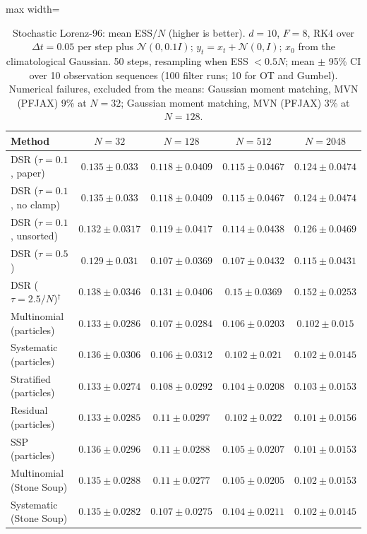 \begin{table}[H]
\centering
\small
\caption{Stochastic Lorenz-96: mean ESS$/N$ (higher is better). $d{=}10$, $F{=}8$, RK4 over $\Delta t{=}0.05$ per step plus $\mathcal N(0,0.1I)$; $y_t=x_t+\mathcal N(0,I)$; $x_0$ from the climatological Gaussian. 50 steps, resampling when ESS $<0.5N$; mean $\pm$ 95\% CI over 10 observation sequences (100 filter runs; 10 for OT and Gumbel). Numerical failures, excluded from the means: Gaussian moment matching, MVN (PFJAX) 9\% at $N{=}32$; Gaussian moment matching, MVN (PFJAX) 3\% at $N{=}128$.}
\label{tab:lorenz96-mean_ess_fraction}
\begin{adjustbox}{max width=\linewidth}
\begin{tabular}{lcccc}
\toprule
Method & $N{=}32$ & $N{=}128$ & $N{=}512$ & $N{=}2048$ \\
\midrule
DSR ($\tau{=}0.1$, paper) & $0.135\pm0.033$ & $0.118\pm0.0409$ & $0.115\pm0.0467$ & $0.124\pm0.0474$ \\
DSR ($\tau{=}0.1$, no clamp) & $0.135\pm0.033$ & $0.118\pm0.0409$ & $0.115\pm0.0467$ & $0.124\pm0.0474$ \\
DSR ($\tau{=}0.1$, unsorted) & $0.132\pm0.0317$ & $0.119\pm0.0417$ & $0.114\pm0.0438$ & $0.126\pm0.0469$ \\
DSR ($\tau{=}0.5$) & $0.129\pm0.031$ & $0.107\pm0.0369$ & $0.107\pm0.0432$ & $0.115\pm0.0431$ \\
DSR ($\tau{=}2.5/N$)$^\dagger$ & $0.138\pm0.0346$ & $\mathbf{0.131\pm0.0406}$ & $\mathbf{0.15\pm0.0369}$ & $\mathbf{0.152\pm0.0253}$ \\
\midrule
Multinomial (particles) & $0.133\pm0.0286$ & $0.107\pm0.0284$ & $0.106\pm0.0203$ & $0.102\pm0.015$ \\
Systematic (particles) & $0.136\pm0.0306$ & $0.106\pm0.0312$ & $0.102\pm0.021$ & $0.102\pm0.0145$ \\
Stratified (particles) & $0.133\pm0.0274$ & $0.108\pm0.0292$ & $0.104\pm0.0208$ & $0.103\pm0.0153$ \\
Residual (particles) & $0.133\pm0.0285$ & $0.11\pm0.0297$ & $0.102\pm0.022$ & $0.101\pm0.0156$ \\
SSP (particles) & $0.136\pm0.0296$ & $0.11\pm0.0288$ & $0.105\pm0.0207$ & $0.101\pm0.0153$ \\
Multinomial (Stone Soup) & $0.135\pm0.0288$ & $0.11\pm0.0277$ & $0.105\pm0.0205$ & $0.102\pm0.0153$ \\
Systematic (Stone Soup) & $0.135\pm0.0282$ & $0.107\pm0.0275$ & $0.104\pm0.0211$ & $0.102\pm0.0145$ \\

\end{tabular}
\end{adjustbox}
\end{table}

